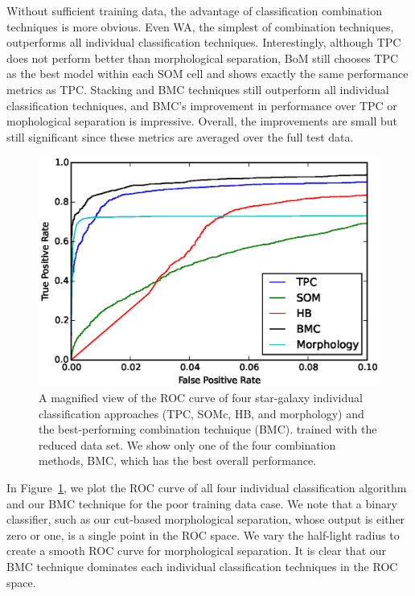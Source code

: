 \documentclass[useAMS,usenatbib]{mn2e}
\begin{document}
Without sufficient training data,
the advantage of classification combination techniques
is more obvious.
Even WA, the simplest of combination techniques, outperforms
all individual classification techniques.
Interestingly, although TPC does not perform better
than morphological separation,
BoM still chooses TPC as the best model within each SOM cell
and shows exactly the same performance metrics as TPC.
Stacking and BMC techniques still outperform
all individual classification techniques,
and BMC's improvement in performance over TPC or mophological separation
is impressive.
Overall, the improvements are small but still significant
since these metrics are averaged over the full test data.


\begin{figure}
  \centering
  \includegraphics[width=\linewidth]{figures/roc_cut.eps}
  \caption{A magnified view of the ROC curve of
           four star-galaxy individual classification approaches
           (TPC, SOMc, HB, and morphology)
           and the best-performing combination technique (BMC).
           trained with the reduced data set.
           We show only one of the four combination methods, BMC,
           which has the best overall performance.}
  \label{fig:roc_cut}
\end{figure}

In Figure~\ref{fig:roc_cut}, we plot the ROC curve
of all four individual classification algorithm
and our BMC technique for the poor training data case.
We note that a binary classifier,
such as our cut-based morphological separation,
whose output is either zero or one,
is a single point in the ROC space.
We vary the half-light radius to create a smooth ROC curve
for morphological separation.
It is clear that our BMC technique dominates
each individual classification techniques in the ROC space.
\end{document}
